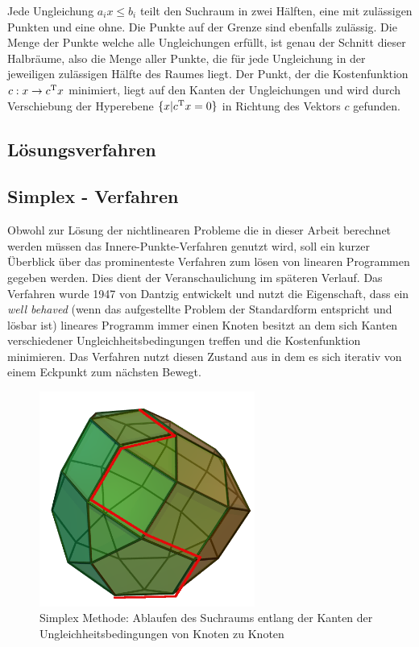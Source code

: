 \documentclass{like}
\begin{document}
Jede Ungleichung $a_i x \leq b_i$ teilt den Suchraum in zwei Hälften, eine mit zulässigen Punkten und eine ohne. Die Punkte auf der Grenze sind ebenfalls zulässig. Die Menge der Punkte welche alle Ungleichungen erfüllt, ist genau der Schnitt dieser Halbräume, also die Menge aller Punkte, die für jede Ungleichung in der jeweiligen zulässigen Hälfte des Raumes liegt. 
Der Punkt, der die Kostenfunktion $c: x \rightarrow c\textsuperscript{T} x$ minimiert, liegt auf den Kanten der Ungleichungen und wird durch Verschiebung der Hyperebene $ \{x| c\textsuperscript{T} x = 0 \}$ in Richtung des Vektors \(c\) gefunden. 


\subsection*{Lösungsverfahren}

\subsection{Simplex - Verfahren}
Obwohl zur Lösung der nichtlinearen Probleme die in dieser Arbeit berechnet werden müssen das Innere-Punkte-Verfahren genutzt wird, soll ein kurzer Überblick über das prominenteste Verfahren zum lösen von linearen Programmen gegeben werden. Dies dient der Veranschaulichung im späteren Verlauf. Das Verfahren wurde 1947 von Dantzig \cite{dantzig51} entwickelt und nutzt die Eigenschaft, dass ein \textit{well behaved} (wenn das aufgestellte Problem der Standardform entspricht und lösbar ist) lineares Programm immer einen Knoten besitzt an dem sich Kanten verschiedener Ungleichheitsbedingungen treffen und die Kostenfunktion minimieren. Das Verfahren nutzt diesen Zustand aus in dem es sich iterativ von einem Eckpunkt zum nächsten Bewegt. 
\begin{figure}[ht!]
	\centering
	\includegraphics[width=200pt]{Abbildungen/simplexMethod.png}
	\caption{Simplex Methode: Ablaufen des Suchraums entlang der Kanten der Ungleichheitsbedingungen von Knoten zu Knoten}
	\label{fig:splxMethod}
\end{figure}
\end{document}
